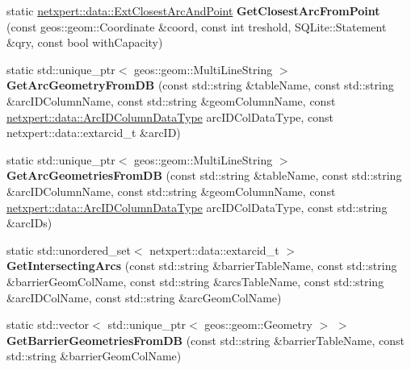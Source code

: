 \begin{DoxyCompactItemize}
\item 
static \hyperlink{structnetxpert_1_1data_1_1ExtClosestArcAndPoint}{netxpert\+::data\+::\+Ext\+Closest\+Arc\+And\+Point} {\bfseries Get\+Closest\+Arc\+From\+Point} (const geos\+::geom\+::\+Coordinate \&coord, const int treshold, S\+Q\+Lite\+::\+Statement \&qry, const bool with\+Capacity)\hypertarget{classnetxpert_1_1io_1_1DBHELPER_ae842b4ce30eee6ec2c85444844318994}{}\label{classnetxpert_1_1io_1_1DBHELPER_ae842b4ce30eee6ec2c85444844318994}

\item 
static std\+::unique\+\_\+ptr$<$ geos\+::geom\+::\+Multi\+Line\+String $>$ {\bfseries Get\+Arc\+Geometry\+From\+DB} (const std\+::string \&table\+Name, const std\+::string \&arc\+I\+D\+Column\+Name, const std\+::string \&geom\+Column\+Name, const \hyperlink{namespacenetxpert_1_1data_a7f0e5c814a8a55ea94f348b10826e206}{netxpert\+::data\+::\+Arc\+I\+D\+Column\+Data\+Type} arc\+I\+D\+Col\+Data\+Type, const netxpert\+::data\+::extarcid\+\_\+t \&arc\+ID)\hypertarget{classnetxpert_1_1io_1_1DBHELPER_af44cf45d7c4ee81a3e4037901efeb43f}{}\label{classnetxpert_1_1io_1_1DBHELPER_af44cf45d7c4ee81a3e4037901efeb43f}

\item 
static std\+::unique\+\_\+ptr$<$ geos\+::geom\+::\+Multi\+Line\+String $>$ {\bfseries Get\+Arc\+Geometries\+From\+DB} (const std\+::string \&table\+Name, const std\+::string \&arc\+I\+D\+Column\+Name, const std\+::string \&geom\+Column\+Name, const \hyperlink{namespacenetxpert_1_1data_a7f0e5c814a8a55ea94f348b10826e206}{netxpert\+::data\+::\+Arc\+I\+D\+Column\+Data\+Type} arc\+I\+D\+Col\+Data\+Type, const std\+::string \&arc\+I\+Ds)\hypertarget{classnetxpert_1_1io_1_1DBHELPER_a1e91daf8cd224e722ea58a522c5043e2}{}\label{classnetxpert_1_1io_1_1DBHELPER_a1e91daf8cd224e722ea58a522c5043e2}

\item 
static std\+::unordered\+\_\+set$<$ netxpert\+::data\+::extarcid\+\_\+t $>$ {\bfseries Get\+Intersecting\+Arcs} (const std\+::string \&barrier\+Table\+Name, const std\+::string \&barrier\+Geom\+Col\+Name, const std\+::string \&arcs\+Table\+Name, const std\+::string \&arc\+I\+D\+Col\+Name, const std\+::string \&arc\+Geom\+Col\+Name)\hypertarget{classnetxpert_1_1io_1_1DBHELPER_afdfafd0732ca51ce231422b5372541d4}{}\label{classnetxpert_1_1io_1_1DBHELPER_afdfafd0732ca51ce231422b5372541d4}

\item 
static std\+::vector$<$ std\+::unique\+\_\+ptr$<$ geos\+::geom\+::\+Geometry $>$ $>$ {\bfseries Get\+Barrier\+Geometries\+From\+DB} (const std\+::string \&barrier\+Table\+Name, const std\+::string \&barrier\+Geom\+Col\+Name)\hypertarget{classnetxpert_1_1io_1_1DBHELPER_a03a39530e7e86cfa58a0c7d69bd95b7a}{}\label{classnetxpert_1_1io_1_1DBHELPER_a03a39530e7e86cfa58a0c7d69bd95b7a}


\end{DoxyCompactItemize}
